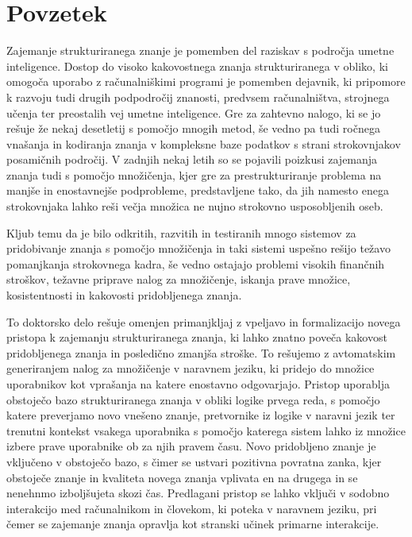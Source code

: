 % 
\chapter*{Povzetek}

Zajemanje strukturiranega znanje je pomemben del raziskav s področja umetne
inteligence. Dostop do visoko kakovostnega znanja strukturiranega v obliko, ki omogoča uporabo z računalniškimi programi je pomemben dejavnik, ki pripomore k razvoju tudi drugih podpodročij znanosti, predvsem računalništva, strojnega učenja ter preostalih vej umetne inteligence. Gre za zahtevno nalogo, ki se jo
rešuje že nekaj desetletij s pomočjo mnogih metod, še vedno pa tudi ročnega vnašanja in kodiranja znanja v kompleksne baze podatkov s strani strokovnjakov
posamičnih področij. V zadnjih nekaj letih so se pojavili poizkusi zajemanja
znanja tudi s pomočjo množičenja, kjer gre za prestrukturiranje problema na
manjše in enostavnejše podprobleme, predstavljene tako, da jih namesto enega strokovnjaka lahko reši večja množica ne nujno strokovno usposobljenih oseb.

Kljub temu da je bilo odkritih, razvitih in testiranih mnogo sistemov za pridobivanje znanja s pomočjo množičenja in taki sistemi uspešno rešijo težavo pomanjkanja strokovnega kadra, še vedno ostajajo problemi visokih finančnih stroškov, težavne priprave nalog za množičenje, iskanja prave množice, kosistentnosti in kakovosti pridobljenega znanja.

To doktorsko delo rešuje omenjen primanjkljaj z vpeljavo in formalizacijo novega pristopa k zajemanju strukturiranega znanja, ki lahko znatno poveča kakovost pridobljenega znanja in posledično zmanjša stroške. To rešujemo z
avtomatskim generiranjem nalog za množičenje v naravnem jeziku, ki pridejo do množice uporabnikov kot vprašanja na katere enostavno odgovarjajo. Pristop
uporablja obstoječo bazo strukturiranega znanja v obliki logike prvega reda, s
pomočjo katere preverjamo novo vnešeno znanje, pretvornike iz logike v naravni jezik ter trenutni kontekst vsakega uporabnika s pomočjo katerega sistem lahko
iz množice izbere prave uporabnike ob za njih pravem času. Novo pridobljeno znanje je vključeno v obstoječo bazo, s čimer se ustvari pozitivna povratna zanka, kjer obstoječe znanje in kvaliteta novega znanja vplivata en na drugega in se nenehnmo izboljšujeta skozi čas. Predlagani pristop se lahko vključi v sodobno interakcijo med računalnikom in človekom, ki poteka v naravnem jeziku,
pri čemer se zajemanje znanja opravlja kot stranski učinek primarne interakcije.

